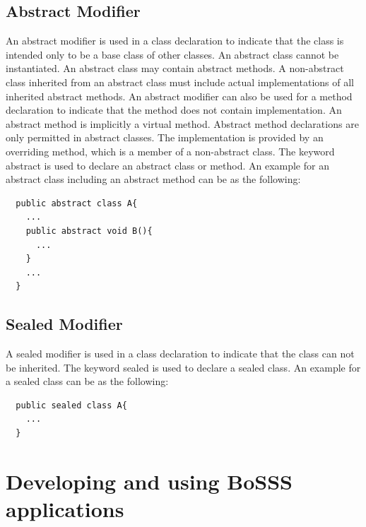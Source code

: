\documentclass[11pt,twoside,a4paper]{fdyartcl}
\begin{document}
\subsection{Abstract Modifier}
An abstract modifier is used in a class declaration to indicate that the class is intended only to be a base class of other classes. An abstract class cannot be instantiated. An abstract class may contain abstract methods. A non-abstract class inherited from an abstract class must include actual implementations of all inherited abstract methods. An abstract modifier can also be used for a method declaration to indicate that the method does not contain implementation. An abstract method is implicitly a virtual  method. Abstract method declarations are only permitted in abstract classes. The implementation is provided by an overriding method, which is a member of a non-abstract class. The keyword {\scriptsize abstract} is used to declare an abstract class or method. An example for an abstract class including an abstract method can be as the following:
{\scriptsize \begin{verbatim}
  public abstract class A{
    ...
    public abstract void B(){
      ...
    }
    ...
  }
\end{verbatim}}
\subsection{Sealed Modifier}
A sealed modifier is used in a class declaration to indicate that the class can not be inherited. The keyword {\scriptsize sealed} is used to declare a sealed class. An example for a sealed class can be as the following:
{\scriptsize \begin{verbatim}
  public sealed class A{
    ...
  }
\end{verbatim}}
\section{Developing and using BoSSS applications}
\end{document}
